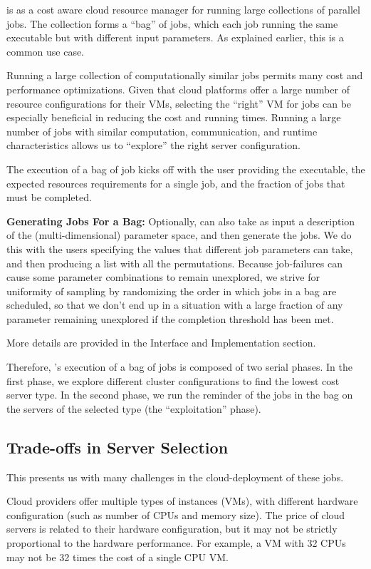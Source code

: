 \sysname is as a cost aware cloud resource manager for running large collections of parallel jobs.
The collection forms a ``bag'' of jobs, which each job running the same executable but with different input parameters.
As explained earlier, this is a common use case.

Running a large collection of computationally similar jobs permits many cost and performance optimizations.
Given that cloud platforms offer a large number of resource configurations for their VMs, selecting the ``right'' VM for jobs can be especially beneficial in reducing the cost and running times.
Running a large number of jobs with similar computation, communication, and runtime characteristics allows us to ``explore'' the right server configuration.


The execution of a bag of job kicks off with the user providing the executable, the expected resources requirements for a single job, and the fraction of jobs that must be completed.

\textbf{Generating Jobs For a Bag:} Optionally, \sysname can also take as input a description of the (multi-dimensional) parameter space, and then generate the jobs.
We do this with the users specifying the values that different job parameters can take, and then producing a list with all the permutations.
Because job-failures can cause some parameter combinations to remain unexplored, we strive for uniformity of sampling by randomizing the order in which jobs in a bag are scheduled, so that we don't end up in a situation with a large fraction of any parameter remaining unexplored if the completion threshold has been met.


More details are provided in the Interface and Implementation section.


Therefore, \sysname's execution of a bag of jobs is composed of two serial phases.
In the first phase, we explore different cluster configurations to find the lowest cost server type.
In the second phase, we run the reminder of the jobs in the bag on the servers of the selected type (the ``exploitation'' phase).

\subsection{Trade-offs in Server Selection}

This presents us with many challenges in the cloud-deployment of these jobs.

Cloud providers offer multiple types of instances (VMs), with different hardware configuration (such as number of CPUs and memory size).
The price of cloud servers is related to their hardware configuration, but it may not be strictly proportional to the hardware performance.
For example, a VM with 32 CPUs may not be 32 times the cost of a single CPU VM.


